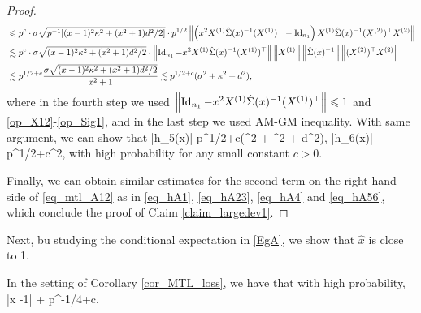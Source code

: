 \begin{proof}
\begin{align}
&\leqslant p^{c}\cdot \sigma \sqrt{p^{-1}[(x-1)^2\kappa^2 + (x^2+1)d^2/2]} \cdot p^{1/2} \left\| \left(x^2 X^{(1)}\hat\Sigma(x)^{-1} (X^{(1)})^\top-\operatorname{Id}_{n_1}\right) X^{(1)} \hat\Sigma(x)^{-1} (X^{(2)})^\top X^{(2)} \right\|  \nonumber\\
&\lesssim p^{c}\cdot \sigma \sqrt{ (x-1)^2\kappa^2 + (x^2+1)d^2/2} \cdot \left\|  \operatorname{Id}_{n_1}-x^2 X^{(1)}\hat\Sigma(x)^{-1} (X^{(1)})^\top\right\|  \left\|X^{(1)}\right\| \left\|\hat\Sigma(x)^{-1}\right\|\left\| (X^{(2)})^\top X^{(2)} \right\|  \nonumber\\
&\lesssim p^{1/2+c}\frac{\sigma \sqrt{ (x-1)^2\kappa^2 + (x^2+1)d^2/2}}{x^2+1} \lesssim p^{1/2+c}(\sigma^2 + \kappa^2 + d^2),\label{eq_hA4}
\end{align}
where in the fourth step we used $\left\|  \operatorname{Id}_{n_1}-x^2 X^{(1)}\hat\Sigma(x)^{-1} (X^{(1)})^\top\right\|\leqslant 1$ and \eqref{op_X12}-\eqref{op_Sig1}, and in the last step we used AM-GM inequality. With same argument, we can show that
\be\label{eq_hA56} \left|h_5(x)\right| \le p^{1/2+c}(\sigma^2 + \kappa^2 + d^2), \quad \left|h_6(x)\right| \le p^{1/2+c}\sigma^2,\ee
with high probability for any small constant $c>0$. %

Finally, we can obtain similar estimates for the second term on the right-hand side of \eqref{eq_mtl_A12} as in  \eqref{eq_hA1}, \eqref{eq_hA23}, \eqref{eq_hA4} and \eqref{eq_hA56}, which conclude the proof of Claim \ref{claim_largedev1}.
 \end{proof}

Next, bu studying the conditional expectation in \eqref{EgA}, we show that $\hat x$ is close to 1. 

\begin{claim}\label{lem_hat_v}
 In the setting of Corollary \ref{cor_MTL_loss}, we have that with high probability,
	\be\label{hatw_add1}|\hat x -1|\le  {} + p^{-1/4+c}.
	\ee
\end{claim}

